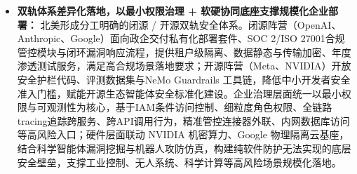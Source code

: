 \begin{itemize}[tabitem]
\item \textbf{双轨体系差异化落地，以最小权限治理 + 软硬协同底座支撑规模化企业部署：}
北美形成分工明确的闭源 / 开源双轨安全体系。闭源阵营（OpenAI、Anthropic、Google）面向政企交付私有化部署套件、SOC 2/ISO 27001合规管控模块与闭环漏洞响应流程，提供租户级隔离、数据静态与传输加密、年度渗透测试服务，满足高合规场景落地要求\cite{anthropicclaudecode2025,googlevertexagentbuilder2026}；开源阵营（Meta、NVIDIA）开放安全护栏代码、评测数据集与NeMo Guardrails 工具链，降低中小开发者安全准入门槛，赋能开源生态智能体安全标准化建设\cite{nvidianemoguardrails2026,metallamafirewall2026}。企业治理层面统一以最小权限与可观测性为核心，基于IAM条件访问控制、细粒度角色权限、全链路tracing追踪跨服务、跨API调用行为，精准管控连接器外联、内网数据库访问等高风险入口\cite{googleagentidentity2026,openaiobservability2026}；硬件层面联动 NVIDIA 机密算力、Google 物理隔离云基座，结合科学智能体漏洞挖掘与机器人攻防仿真，构建纯软件防护无法实现的底层安全壁垒，支撑工业控制、无人系统、科学计算等高风险场景规模化落地\cite{nvidiaconfidentialcomputing2026,googlecoscientist2025}。
\end{itemize}

\begingroup
\enlargethispage{1cm}
\footnotesize
\centering


